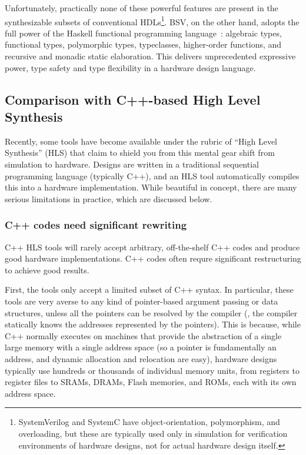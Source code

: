 Unfortunately, practically none of these powerful features are present
in the synthesizable subsets of conventional
HDLs\footnote{SystemVerilog and SystemC have object-orientation,
polymorphism, and overloading, but these are typically used only in
simulation for verification environments of hardware designs, not for
actual hardware design itself.}.  BSV, on the other hand, adopts the
full power of the Haskell functional programming
language~\cite{PeytonJones2003}: algebraic types, functional types,
polymorphic types, typeclasses, higher-order functions, and recursive
and monadic static elaboration.  This delivers unprecedented
expressive power, type safety and type flexibility in a hardware
design language.


\subsection{Comparison with C++-based High Level Synthesis}

Recently, some tools have become available under the rubric of ``High
Level Synthesis'' (HLS) that claim to shield you from this mental gear
shift from simulation to hardware.  Designs are written in a
traditional sequential programming language (typically C++), and an
HLS tool automatically compiles this into a hardware implementation.
While beautiful in concept, there are many serious limitations in
practice, which are discussed below.


\subsubsection{C++ codes need significant rewriting}

C++ HLS tools will rarely accept arbitrary, off-the-shelf C++ codes
and produce good hardware implementations.  C++ codes often requre
significant restructuring to achieve good results.

First, the tools only accept a limited subset of C++ syntax. In
particular, these tools are very averse to any kind of pointer-based
argument passing or data structures, unless all the pointers can be
resolved by the compiler ({\ie}, the compiler statically knows the
addresses represented by the pointers).  This is because, while C++
normally executes on machines that provide the abstraction of a single
large memory with a single address space (so a pointer is
fundamentally an address, and dynamic allocation and relocation are
easy), hardware designs typically use hundreds or thousands of
individual memory units, from registers to register files to SRAMs,
DRAMs, Flash memories, and ROMs, each with its own address space.

